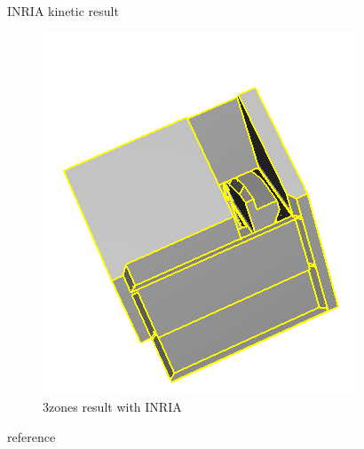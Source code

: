\documentclass[10pt]{beamer}
\begin{document}
\begin{frame}{INRIA kinetic result }
\begin{figure}[H]
\begin{minipage}[t]{0.35\textwidth}
            \includegraphics[width=\textwidth]{../../images/screen_kinetic/ACJasmin_result_INRIA.png}
            \caption*{3zones result with INRIA}
          \end{minipage}
      \end{figure}  
\end{frame}


\begin{frame}[allowframebreaks]{reference}
    \nocite{*}
    
    
\end{frame}
\end{document}
